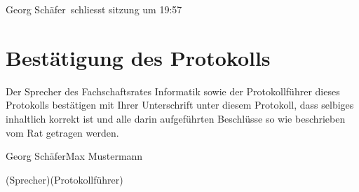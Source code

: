 \documentclass[a4paper, 11pt]{article} %
\newcommand{\protokoller}{Max Mustermann}
\newcommand{\fsiPresident}{Georg Schäfer}
\begin{document}
\fsiPresident~schliesst sitzung um 19:57

\pagebreak
\section{Bestätigung des Protokolls}
Der Sprecher des Fachschaftsrates Informatik sowie der Protokollführer dieses Protokolls bestätigen mit Ihrer Unterschrift unter diesem Protokoll, dass selbiges inhaltlich korrekt ist und alle darin aufgeführten Beschlüsse so wie beschrieben vom Rat getragen werden.
\\

\vspace{3.5cm}
\hrulefill \hfill \hrulefill

\fsiPresident \hfill \protokoller

{\footnotesize (Sprecher)\hfill (Protokollführer)}
\end{document}
